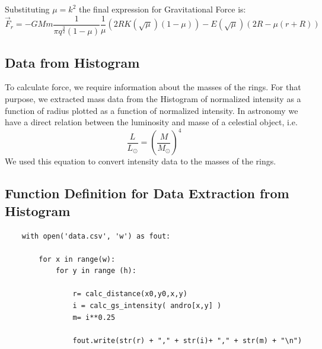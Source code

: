 Substituting $\mu = k^2$ the final expression for Gravitational Force is:
\begin{equation}
   \vec{F}_{r} = - GMm \frac{1}{\pi q^ \frac{3}{2} (1- \mu)} \frac{1}{\mu} (2 R K(\sqrt{\mu}) (1 - \mu))- E (\sqrt{\mu}) (2 R - \mu (r + R))
\end{equation}

\subsection{Data from Histogram}
To calculate force, we require information about the masses of the rings. For that purpose, we extracted mass data from the Histogram of normalized intensity as a function of radius plotted as a function of normalized intensity. In astronomy we have a direct relation between the luminosity and masse of a celestial object, i.e. 
%
\begin{equation}
   \frac{L}{L_{\odot}} = (\frac{M}{M_{\odot}})^4 
\end{equation}
We used this equation to convert intensity data to the masses of the rings.   

\subsection{Function Definition for Data Extraction from Histogram}
\begin{verbatim}
    with open('data.csv', 'w') as fout:

        for x in range(w):
            for y in range (h):

                r= calc_distance(x0,y0,x,y)
                i = calc_gs_intensity( andro[x,y] )
                m= i**0.25 

                fout.write(str(r) + "," + str(i)+ "," + str(m) + "\n")
\end{verbatim}

